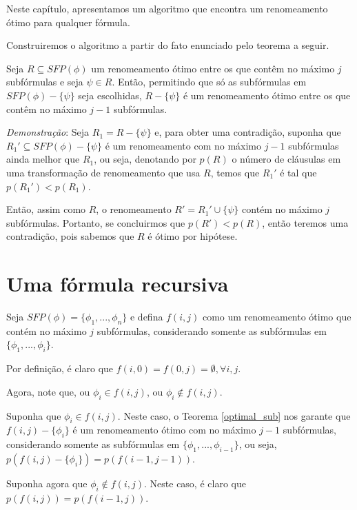 
\indent

Neste capítulo, apresentamos um algoritmo que encontra um renomeamento ótimo para qualquer fórmula.

Construiremos o algoritmo a partir do fato enunciado pelo teorema a seguir.

\begin{theorem}
	\label{optimal_sub}
	Seja $R \subseteq SFP(\phi)$ um renomeamento ótimo entre os que contêm no máximo $j$ subfórmulas e seja $\psi \in R$. Então, permitindo que só as subfórmulas em $SFP(\phi) - \{\psi \}$ seja escolhidas, $R - \{\psi\}$ é um renomeamento ótimo entre os que contêm no máximo $j-1$ subfórmulas.
\end{theorem}

\emph{Demonstração}: Seja $R_1 = R - \{\psi\}$ e, para obter uma contradição, suponha que $R_1' \subseteq SFP(\phi) - \{\psi \}$ é um renomeamento com no máximo $j-1$ subfórmulas ainda melhor que $R_1$, ou seja, denotando por $p(R)$ o número de cláusulas em uma transformação de renomeamento que usa $R$, temos que $R_1'$ é tal que $p(R_1') < p(R_1)$.

Então, assim como $R$, o renomeamento $R' = R_1' \cup \{\psi \}$ contém no máximo $j$ subfórmulas. Portanto, se concluirmos que $p(R') < p(R)$, então teremos uma contradição, pois sabemos que $R$ é ótimo por hipótese.

\section{Uma fórmula recursiva}

\indent

Seja $SFP(\phi) = \{\phi_1,...,\phi_n \}$ e defina $f(i,j)$ como um renomeamento ótimo que contém no máximo $j$ subfórmulas, considerando somente as subfórmulas em $\{\phi_1,...,\phi_i \}$.

Por definição, é claro que $f(i,0) = f(0,j) = \emptyset, \forall i,j$.

Agora, note que, ou $\phi_i \in f(i,j)$, ou $\phi_i \notin f(i,j)$.

Suponha que $\phi_i \in f(i,j)$. Neste caso, o Teorema \ref{optimal_sub} nos garante que $f(i,j) - \{\phi_i \}$ é um renomeamento ótimo com no máximo $j-1$ subfórmulas, considerando somente as subfórmulas em $\{\phi_1,...,\phi_{i-1} \}$, ou seja, $p(f(i,j) - \{\phi_i \}) = p(f(i-1,j-1))$.

Suponha agora que $\phi_i \notin f(i,j)$. Neste caso, é claro que $p(f(i,j)) = p(f(i-1,j))$.

